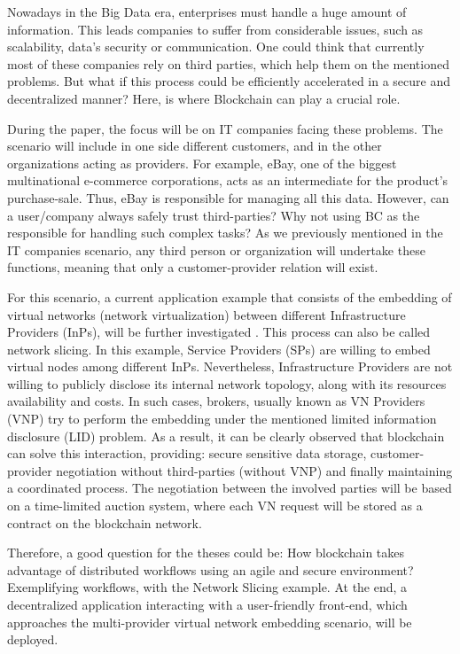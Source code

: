 Nowadays in the Big Data era, enterprises must handle a huge amount of information. This leads companies to suffer from considerable issues, such as scalability, data's security or communication. One could think that currently most of these companies rely on third parties, which help them on the mentioned problems. But what if this process could be efficiently accelerated in a secure and decentralized manner? Here, is where Blockchain can play a crucial role.

During the paper, the focus will be on IT companies facing these problems. The scenario will include in one side different customers, and in the other organizations acting as providers. For example, eBay, one of the biggest multinational e-commerce corporations, acts as an intermediate for the product's purchase-sale. Thus, eBay is responsible for managing all this data. However, can a user/company always safely trust third-parties? Why not using BC as the responsible for handling such complex tasks? As we previously mentioned in the IT companies scenario, any third person or organization will undertake these functions, meaning that only a customer-provider relation will exist.

For this scenario, a current application example that consists of the embedding of virtual networks (network virtualization) between different Infrastructure Providers (InPs), will be further investigated \cite{dietrich2015multi}. This process can also be called network slicing. In this example, Service Providers (SPs) are willing to embed virtual nodes among different InPs. Nevertheless, Infrastructure Providers are not willing to publicly disclose its internal network topology, along with its resources availability and costs. In such cases, brokers, usually known as VN Providers (VNP) try to perform the embedding under the mentioned limited information disclosure (LID) problem. As a result, it can be clearly observed that blockchain can solve this interaction, providing: secure sensitive data storage, customer-provider negotiation without third-parties (without VNP) and finally maintaining a coordinated process. The negotiation between the involved parties will be based on a time-limited auction system, where each VN request will be stored as a contract on the blockchain network.

Therefore, a good question for the theses could be: How blockchain takes advantage of distributed workflows using an agile and secure environment? Exemplifying workflows, with the Network Slicing example. At the end, a decentralized application interacting with a user-friendly front-end, which approaches the multi-provider virtual network embedding scenario, will be deployed.


